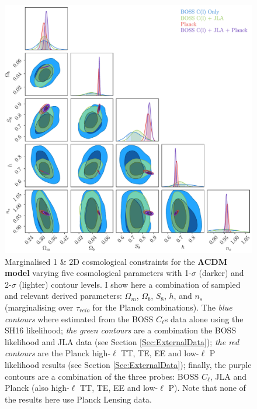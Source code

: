 \begin{figure}
\begin{center}
\includegraphics[width=\textwidth]{BOSS-FIGS/LCDM_Cosmology.pdf}
\caption[Marginalised 1 \& 2D cosmological constraints for the $\Lambda$CDM model.]{Marginalised 1 \& 2D cosmological constraints for the \textbf{$\mathbf{\Lambda}$CDM model} varying five cosmological parameters with 1-$\sigma$ (darker) and 2-$\sigma$ (lighter) contour levels. I show here a combination of sampled and relevant derived parameters: $\Omega_m$, $\Omega_b$, $S_8$, $h$, and $n_s$ (marginalising over $\tau_{reio}$ for the Planck combinations). The \textit{blue contours} where estimated from the BOSS $C_{\ell}$s data alone using the SH16 likelihood; \textit{the green contours} are a combination the BOSS likelihood and JLA data (see Section \ref{Sec:ExternalData}); \textit{the red contours} are the Planck high-$\ell$ TT, TE, EE and low-$\ell$ P likelihood results (see Section \ref{Sec:ExternalData}); finally, the purple contours are a combination of the three probes: BOSS $C_{\ell}$, JLA and Planck (also high-$\ell$ TT, TE, EE and low-$\ell$ P). Note that none of the results here use Planck Lensing data.}
\label{fig:LCDM_Cosmology}
\end{center}
\end{figure}

